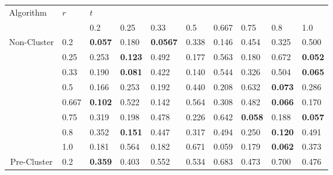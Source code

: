 \documentclass[12pt]{article}
\begin{document}
\begin{table}[h]
\centering
\begin{tabular}{|l|l|l|l|l|l|l|l|l|l|}
\hline
\multirow{2}{*}{Algorithm}                         & \multirow{2}{*}{\hspace{0.017\linewidth}$r$} & \multicolumn{8}{l|}{\hspace{0.28\linewidth} $t$}                                                                                         \\ \cline{3-10} 
                                                   &                    & 0.2         & 0.25        & 0.33         & 0.5         & 0.667       & 0.75        & 0.8         & 1.0         \\ \hline
\multirow{8}{*}{Non-Cluster}                       & 0.2                & {\bf 0.057} & 0.180       & {\bf 0.0567} & 0.338       & 0.146       & 0.454       & 0.325       & 0.500       \\
                                                   & 0.25               & 0.253       & {\bf 0.123} & 0.492        & 0.177       & 0.563       & 0.180       & 0.672       & {\bf 0.052} \\
                                                   & 0.33               & 0.190       & {\bf 0.081} & 0.422        & 0.140       & 0.544       & 0.326       & 0.504       & {\bf 0.065} \\
                                                   & 0.5                & 0.166       & 0.253       & 0.192        & 0.440       & 0.208       & 0.632       & {\bf 0.073} & 0.286       \\
                                                   & 0.667              & {\bf 0.102} & 0.522       & 0.142        & 0.564       & 0.308       & 0.482       & {\bf 0.066} & 0.170       \\
                                                   & 0.75               & 0.319       & 0.198       & 0.478        & 0.226       & 0.642       & {\bf 0.058} & 0.188       & {\bf 0.057} \\
                                                   & 0.8                & 0.352       & {\bf 0.151} & 0.447        & 0.317       & 0.494       & 0.250       & {\bf 0.120} & 0.491       \\
                                                   & 1.0                & 0.181       & 0.564       & 0.182        & 0.671       & 0.059       & 0.179       & {\bf 0.062} & 0.373       \\ \hline
\multicolumn{1}{|c|}{\multirow{8}{*}{Pre-Cluster}} & 0.2                & {\bf 0.359} & 0.403       & 0.552        & 0.534       & 0.683       & 0.473       & 0.700       & 0.476       \\

\end{tabular}
\end{table}
\end{document}

